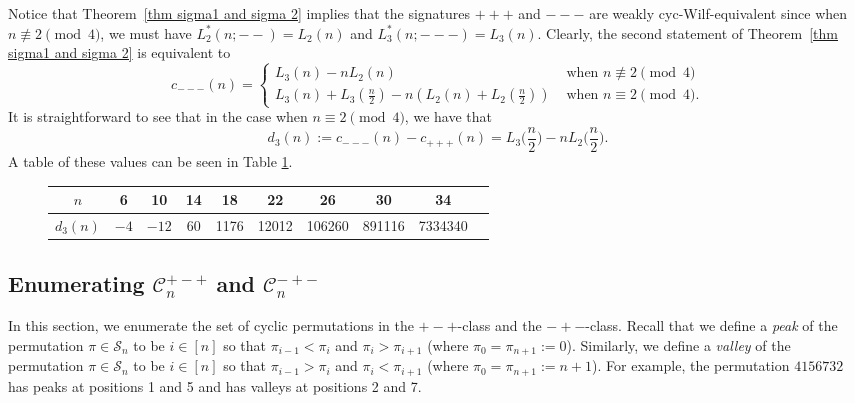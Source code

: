 \documentclass[12pt]{article}
\newcommand{\todo}[1]{\vspace{2 mm}\par\noindent
   \marginpar[\flushright\textsc{ToDo}]{\textsc{ToDo}}\framebox{\begin{minipage}[c]{\textwidth}
   \tt #1 \end{minipage}}\vspace{2 mm}\par}
\renewcommand{\S}{\mathcal{S}}
\theoremstyle{plain}
\theoremstyle{definition}
\begin{document}
Notice that Theorem~\ref{thm sigma1 and sigma 2} implies that the signatures $+++$ and $---$ are weakly cyc-Wilf-equivalent since when $n\not\equiv 2\!\pmod 4$, we must have $L_2^*(n;--) = L_2(n)$ and $L_3^*(n;---) = L_3(n)$. Clearly, the second statement of Theorem~\ref{thm sigma1 and sigma 2} is equivalent to $$
c_{---}(n) = \begin{cases}
 L_3(n) - nL_2(n) & \text{ when $n\not\equiv 2\!\!\!\!\pmod 4$} \\ 
 L_3(n) +L_3(\frac{n}{2})- n(L_2(n)+L_2(\frac{n}{2})) & \text{ when $n\equiv 2\!\!\!\!\pmod 4$}. 
\end{cases}
$$
It is straightforward to see that in the case when $n\equiv 2\!\pmod 4$, we have that $$d_3(n):=c_{---}(n)-c_{+++}(n) = L_3\bigg(\frac{n}{2}\bigg)-nL_2\bigg(\frac{n}{2}\bigg).$$ A table of these values can be seen in Table \ref{TABLE c1 c2}.

	\begin{figure}[h]
		\centering
	\begin{tabular}{|c|c|c|c|c|c|c|c|c|c|}
	\hline
	$n$ & 6 & 10 & 14 & 18 & 22 & 26 & 30& 34\\ \hline
	 $d_3(n)$ & $-4$ & $-12$ & 60 & 1176 & 12012 & 106260& 891116 & 7334340\\ \hline
	\end{tabular} 
	\label{TABLE c1 c2}
	\end{figure}


\subsection{Enumerating $\mathcal C_n^{+-+}$ and $\mathcal C_n^{-+-}$}\label{SECTION 34}

In this section, we enumerate the set of cyclic permutations in the $+-+$-class and the $-+-$-class. Recall that we define a \textit{peak} of the permutation $\pi\in\S_n$ to be $i\in[n]$ so that $\pi_{i-1}<\pi_i$ and $\pi_i>\pi_{i+1}$ (where $\pi_0=\pi_{n+1}:=0$). Similarly, we define a \textit{valley} of the permutation $\pi\in\S_n$ to be $i\in[n]$ so that $\pi_{i-1}>\pi_i$ and $\pi_i<\pi_{i+1}$ (where $\pi_0=\pi_{n+1}:=n+1$). For example, the permutation $4156732$ has peaks at positions 1 and 5 and has valleys at positions 2 and 7. 
\end{document}

